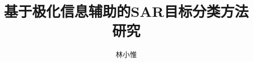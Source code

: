 \documentclass[promaster]{thesis-uestc}
\title{基于极化信息辅助的SAR目标分类方法研究}{Research on SAR target classification method based on polarization information assistance}
\author{林小惟}{Xiaowei Lin}
\begin{document}
\makecover





\thesistableofcontents








% 



%
% 
%


%

% 
% 
\end{document}
